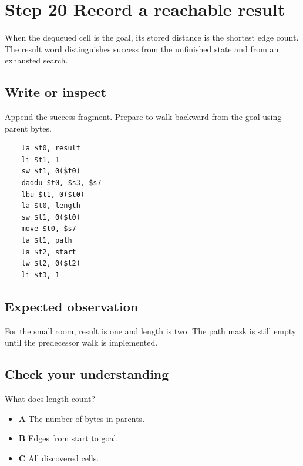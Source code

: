 \section{Step 20 Record a reachable result}\label{maze-s20}

When the dequeued cell is the goal, its stored distance is the shortest edge count. The result word distinguishes success from the unfinished state and from an exhausted search.

\subsection{Write or inspect}

Append the success fragment. Prepare to walk backward from the goal using parent bytes.

\begin{verbatim}
    la $t0, result
    li $t1, 1
    sw $t1, 0($t0)
    daddu $t0, $s3, $s7
    lbu $t1, 0($t0)
    la $t0, length
    sw $t1, 0($t0)
    move $t0, $s7
    la $t1, path
    la $t2, start
    lw $t2, 0($t2)
    li $t3, 1
\end{verbatim}

\subsection{Expected observation}

For the small room, result is one and length is two. The path mask is still empty until the predecessor walk is implemented.

\subsection{Check your understanding}

What does length count?

\begin{itemize}
  \item \textbf{A} The number of bytes in parents.
  \item \textbf{B} Edges from start to goal.
  \item \textbf{C} All discovered cells.
\end{itemize}
